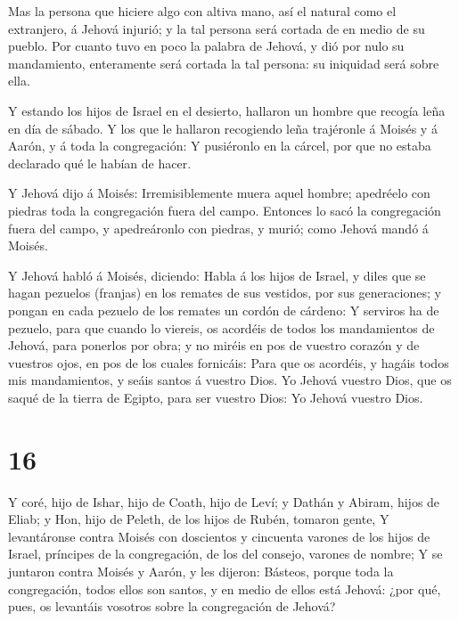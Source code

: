  Mas la persona que hiciere algo con altiva mano, así el
natural como el extranjero, á Jehová injurió; y la tal persona será
cortada de en medio de su pueblo.  Por cuanto tuvo en poco
la palabra de Jehová, y dió por nulo su mandamiento, enteramente será
cortada la tal persona: su iniquidad será sobre ella.

 Y estando los hijos de Israel en el desierto, hallaron un
hombre que recogía leña en día de sábado.  Y los que le
hallaron recogiendo leña trajéronle á Moisés y á Aarón, y á toda la
congregación:  Y pusiéronlo en la cárcel, por que no estaba
declarado qué le habían de hacer.

 Y Jehová dijo á Moisés: Irremisiblemente muera aquel
hombre; apedréelo con piedras toda la congregación fuera del campo.
 Entonces lo sacó la congregación fuera del campo, y
apedreáronlo con piedras, y murió; como Jehová mandó á Moisés.

 Y Jehová habló á Moisés, diciendo:  Habla á
los hijos de Israel, y diles que se hagan pezuelos (franjas) en los
remates de sus vestidos, por sus generaciones; y pongan en cada pezuelo
de los remates un cordón de cárdeno:  Y serviros ha de
pezuelo, para que cuando lo viereis, os acordéis de todos los
mandamientos de Jehová, para ponerlos por obra; y no miréis en pos de
vuestro corazón y de vuestros ojos, en pos de los cuales fornicáis:
 Para que os acordéis, y hagáis todos mis mandamientos, y
seáis santos á vuestro Dios.  Yo Jehová vuestro Dios, que
os saqué de la tierra de Egipto, para ser vuestro Dios: Yo Jehová
vuestro Dios.

\hypertarget{section-15}{%
\section{16}\label{section-15}}

 Y coré, hijo de Ishar, hijo de Coath, hijo de Leví; y
Dathán y Abiram, hijos de Eliab; y Hon, hijo de Peleth, de los hijos de
Rubén, tomaron gente,  Y levantáronse contra Moisés con
doscientos y cincuenta varones de los hijos de Israel, príncipes de la
congregación, de los del consejo, varones de nombre;  Y se
juntaron contra Moisés y Aarón, y les dijeron: Básteos, porque toda la
congregación, todos ellos son santos, y en medio de ellos está Jehová:
¿por qué, pues, os levantáis vosotros sobre la congregación de Jehová?

